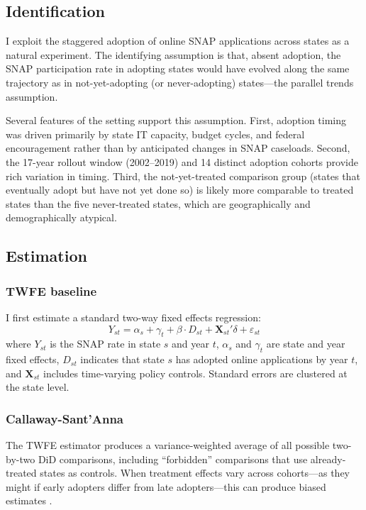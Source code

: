 \documentclass[12pt]{article}
\begin{document}
\subsection{Identification}

I exploit the staggered adoption of online SNAP applications across states as a natural experiment. The identifying assumption is that, absent adoption, the SNAP participation rate in adopting states would have evolved along the same trajectory as in not-yet-adopting (or never-adopting) states---the parallel trends assumption.

Several features of the setting support this assumption. First, adoption timing was driven primarily by state IT capacity, budget cycles, and federal encouragement rather than by anticipated changes in SNAP caseloads. Second, the 17-year rollout window (2002--2019) and 14 distinct adoption cohorts provide rich variation in timing. Third, the not-yet-treated comparison group (states that eventually adopt but have not yet done so) is likely more comparable to treated states than the five never-treated states, which are geographically and demographically atypical.

\subsection{Estimation}

\subsubsection*{TWFE baseline} I first estimate a standard two-way fixed effects regression:
\begin{equation}
Y_{st} = \alpha_s + \gamma_t + \beta \cdot D_{st} + \mathbf{X}_{st}'\delta + \varepsilon_{st}
\label{eq:twfe}
\end{equation}
where $Y_{st}$ is the SNAP rate in state $s$ and year $t$, $\alpha_s$ and $\gamma_t$ are state and year fixed effects, $D_{st}$ indicates that state $s$ has adopted online applications by year $t$, and $\mathbf{X}_{st}$ includes time-varying policy controls. Standard errors are clustered at the state level.

\subsubsection*{Callaway-Sant'Anna} The TWFE estimator produces a variance-weighted average of all possible two-by-two DiD comparisons, including ``forbidden'' comparisons that use already-treated states as controls. When treatment effects vary across cohorts---as they might if early adopters differ from late adopters---this can produce biased estimates \citep{goodman2021}.
\end{document}
